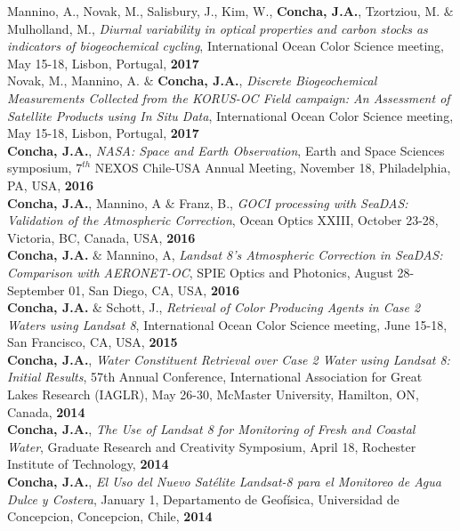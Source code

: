 \documentclass[11pt]{res}
\begin{document}
\begin{resume}
Mannino, A., Novak, M., Salisbury, J., Kim, W., {\bf Concha, J.A.}, Tzortziou, M. $\&$ Mulholland, M., {\it Diurnal variability in optical properties and carbon stocks as indicators of biogeochemical cycling}, International Ocean Color Science meeting, May 15-18, Lisbon, Portugal, {\bf 2017}
\vspace{0.1in}\\
Novak, M., Mannino, A. $\&$ {\bf Concha, J.A.}, {\it Discrete Biogeochemical Measurements Collected from the KORUS-OC Field campaign: An Assessment of Satellite Products using In Situ Data}, International Ocean Color Science meeting, May 15-18, Lisbon, Portugal, {\bf 2017}
\vspace{0.1in}\\
{\bf Concha, J.A.}, {\it NASA: Space and Earth Observation}, Earth and Space Sciences symposium, $7^{th}$ NEXOS Chile-USA Annual Meeting, November 18, Philadelphia, PA, USA, {\bf 2016}
\vspace{0.1in}\\
{\bf Concha, J.A.}, Mannino, A $\&$ Franz, B., {\it GOCI processing with SeaDAS: Validation of the Atmospheric Correction}, Ocean Optics XXIII, October 23-28, Victoria, BC, Canada, USA, {\bf 2016}
\vspace{0.1in}\\
{\bf Concha, J.A.} $\&$ Mannino, A, {\it Landsat 8’s Atmospheric Correction in SeaDAS: Comparison with AERONET-OC}, SPIE Optics and Photonics,  August 28-September 01, San Diego, CA, USA, {\bf 2016}
\vspace{-0.1in}\\
{\bf Concha, J.A.} $\&$ Schott, J., {\it Retrieval of Color Producing Agents in Case 2 Waters using Landsat 8}, International Ocean Color Science meeting, June 15-18, San Francisco, CA, USA, {\bf 2015}
\vspace{0.1in}\\
{\bf Concha, J.A.}, {\it Water Constituent Retrieval over Case 2 Water using Landsat 8: Initial Results}, 57th Annual Conference, International Association for Great Lakes Research (IAGLR), May 26-30, McMaster University, Hamilton, ON, Canada, {\bf 2014}
\vspace{0.1in}\\
{\bf Concha, J.A.}, {\it The Use of Landsat 8 for Monitoring of Fresh and Coastal Water}, Graduate Research and Creativity Symposium, April 18, Rochester Institute of Technology, {\bf 2014}
\vspace{0.1in}\\
{\bf Concha, J.A.}, {\it El Uso del Nuevo Satélite Landsat-8 para el Monitoreo de Agua Dulce y Costera}, January 1, Departamento de Geofísica, Universidad de Concepcion, Concepcion, Chile, {\bf 2014}

\end{resume}
\end{document}
